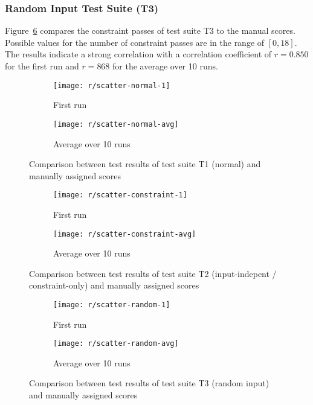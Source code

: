\subsubsection{Random Input Test Suite (T3)}

Figure~\ref{fig:scatter_constraint} compares the constraint passes of test suite T3 to the manual scores.
Possible values for the number of constraint passes are in the range of $[0, 18]$.
The results indicate a strong correlation with a correlation coefficient of $r = 0.850$ for the first run and $r = 868$ for the average over 10 runs.

\begin{figure}[htpb]
    \centering
    \begin{subfigure}{.75\textwidth}
        \texttt{[image: r/scatter-normal-1]}
        \caption{First run}
        \label{fig:scatter_normal_1}
    \end{subfigure}

    \begin{subfigure}{.75\textwidth}
        \texttt{[image: r/scatter-normal-avg]}
        \caption{Average over 10 runs}
        \label{fig:scatter_normal_avg}
    \end{subfigure}
    \caption{Comparison between test results of test suite T1 (normal) and manually assigned scores}
    \label{fig:scatter_normal}
\end{figure}

\begin{figure}[htpb]
    \centering
    \begin{subfigure}{.75\textwidth}
        \texttt{[image: r/scatter-constraint-1]}
        \caption{First run}
        \label{fig:scatter_constraint_1}
    \end{subfigure}

    \begin{subfigure}{.75\textwidth}
        \texttt{[image: r/scatter-constraint-avg]}
        \caption{Average over 10 runs}
        \label{fig:scatter_constraint_avg}
    \end{subfigure}
    \caption{Comparison between test results of test suite T2 (input-indepent / constraint-only) and manually assigned scores}
    \label{fig:scatter_constraint}
\end{figure}

\begin{figure}[htpb]
    \centering
    \begin{subfigure}{.75\textwidth}
        \texttt{[image: r/scatter-random-1]}
        \caption{First run}
        \label{fig:scatter_random_1}
    \end{subfigure}

    \begin{subfigure}{.75\textwidth}
        \texttt{[image: r/scatter-random-avg]}
        \caption{Average over 10 runs}
        \label{fig:scatter_random_avg}
    \end{subfigure}
    \caption{Comparison between test results of test suite T3 (random input) and manually assigned scores}
    \label{fig:scatter_random}
\end{figure}

